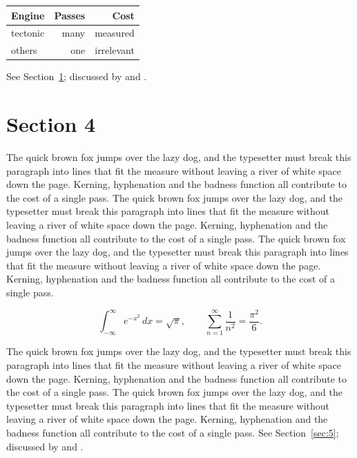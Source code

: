 \documentclass{article}
\begin{document}
\begin{center}
\begin{tabular}{lrr}
\toprule
Engine & Passes & Cost \\
\midrule
tectonic & many & measured \\
others & one & irrelevant \\
\bottomrule
\end{tabular}
\end{center}

See Section~\ref{sec:4}; discussed by \textcite{k4} and \textcite{l1}.
\section{Section 4}
\label{sec:4}
The quick brown fox jumps over the lazy dog, and the typesetter must break this paragraph into lines that fit the measure without leaving a river of white space down the page. Kerning, hyphenation and the badness function all contribute to the cost of a single pass. The quick brown fox jumps over the lazy dog, and the typesetter must break this paragraph into lines that fit the measure without leaving a river of white space down the page. Kerning, hyphenation and the badness function all contribute to the cost of a single pass. The quick brown fox jumps over the lazy dog, and the typesetter must break this paragraph into lines that fit the measure without leaving a river of white space down the page. Kerning, hyphenation and the badness function all contribute to the cost of a single pass. 

\begin{equation}\label{eq:4}
\int_{-\infty}^{\infty} e^{-x^{2}}\,dx = \sqrt{\pi}, \qquad
\sum_{n=1}^{\infty} \frac{1}{n^{2}} = \frac{\pi^{2}}{6}.
\end{equation}

The quick brown fox jumps over the lazy dog, and the typesetter must break this paragraph into lines that fit the measure without leaving a river of white space down the page. Kerning, hyphenation and the badness function all contribute to the cost of a single pass. The quick brown fox jumps over the lazy dog, and the typesetter must break this paragraph into lines that fit the measure without leaving a river of white space down the page. Kerning, hyphenation and the badness function all contribute to the cost of a single pass. 
See Section~\ref{sec:5}; discussed by \textcite{k5} and \textcite{l2}.
\end{document}
